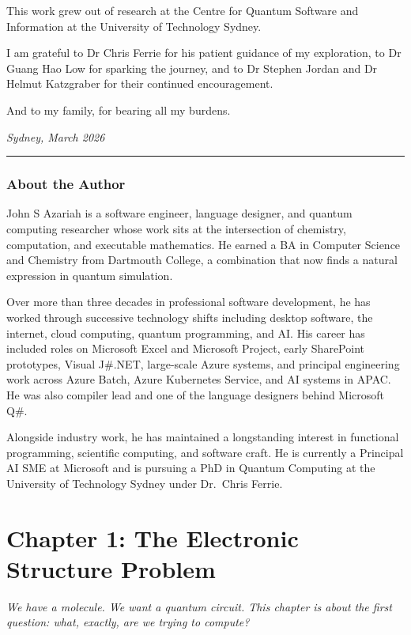 \documentclass[
  11pt,
  oneside]{book}
\begin{document}
This work grew out of research at the Centre for Quantum Software and
Information at the University of Technology Sydney.

I am grateful to Dr Chris Ferrie for his patient guidance of my
exploration, to Dr Guang Hao Low for sparking the journey, and to Dr
Stephen Jordan and Dr Helmut Katzgraber for their continued
encouragement.

And to my family, for bearing all my burdens.

\emph{Sydney, March 2026}

\begin{center}\rule{0.5\linewidth}{0.5pt}\end{center}

\subsection{About the Author}\label{about-the-author}

John S Azariah is a software engineer, language designer, and quantum
computing researcher whose work sits at the intersection of chemistry,
computation, and executable mathematics. He earned a BA in Computer
Science and Chemistry from Dartmouth College, a combination that now
finds a natural expression in quantum simulation.

Over more than three decades in professional software development, he
has worked through successive technology shifts including desktop
software, the internet, cloud computing, quantum programming, and AI.
His career has included roles on Microsoft Excel and Microsoft Project,
early SharePoint prototypes, Visual J\#.NET, large-scale Azure systems,
and principal engineering work across Azure Batch, Azure Kubernetes
Service, and AI systems in APAC. He was also compiler lead and one of
the language designers behind Microsoft Q\#.

Alongside industry work, he has maintained a longstanding interest in
functional programming, scientific computing, and software craft. He is
currently a Principal AI SME at Microsoft and is pursuing a PhD in
Quantum Computing at the University of Technology Sydney under Dr.~Chris
Ferrie.

\chapter{Chapter 1: The Electronic Structure
Problem}\label{chapter-1-the-electronic-structure-problem}

\emph{We have a molecule. We want a quantum circuit. This chapter is
about the first question: what, exactly, are we trying to compute?}
\end{document}
